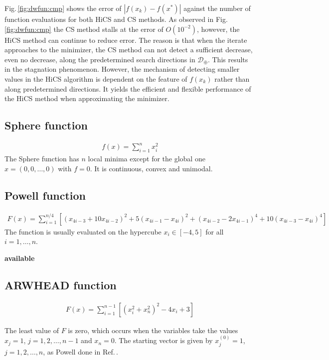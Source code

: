 \documentclass[final,1p,times]{elsarticle}
\begin{document}
Fig.\,\ref{fig:dwfun:cmp} shows the error of
$|f(x_k)-f(x^*)|$ against the number of function
evaluations for both HiCS and CS methods. As observed in
Fig.\,\ref{fig:dwfun:cmp} the CS method stalls at the error of 
$O(10^{-2})$, however, the HiCS method can
continue to reduce error. 
The reason is that when the iterate approaches to the minimizer,
the CS method can not detect a sufficient decrease, even no
decrease, along the predetermined search directions in $\mathcal{D}_{\oplus}$.
This results in the stagnation phenomenon.
However, the mechanism of detecting smaller values in the HiCS
algorithm is dependent on the feature of $f(x_k)$ rather than
along predetermined directions. It yields the efficient and
flexible performance of the HiCS method when approximating the
minimizer.



\subsection{Sphere function}
\label{subsec:sphere}

\begin{align}
	f(x) = \sum_{i=1}^n x_i^2
	\label{}
\end{align}
The Sphere function has $n$ local minima except for the
global one $x=(0,0,\dots,0)$ with $f=0$.
It is continuous, convex and unimodal. 

\subsection{Powell function}
\label{subsec:powell}

\begin{align}
	F(x) = \sum_{i=1}^{n/4}[(x_{4i-3}+10 x_{4i-2})^2 +
	5(x_{4i-1}-x_{4i})^2 + (x_{4i-2}-2 x_{4i-1})^4 +
	10(x_{4i-3}-x_{4i})^4]
	\label{}
\end{align}
The function is usually evaluated on the hypercube $x_i\in[-4,5]$
for all $i=1,\dots,n$.

\textbf{available}


\subsection{ARWHEAD function}
\label{subsec:ARWHEAD}

\begin{align}
	F(x) = \sum_{i=1}^{n-1}[(x_i^2+x_n^2)^2 - 4 x_i +3]
	\label{}
\end{align}

The least value of $F$ is zero, which occurs when the variables take the values
$x_j=1$, $j=1,2,\dots,n-1$ and $x_n=0$. 
The starting vector is given by $x_j^{(0)}=1$, $j=1,2,\dots,n$, as
Powell done in Ref.\,\cite{powell2006newuoa}.
\end{document}
